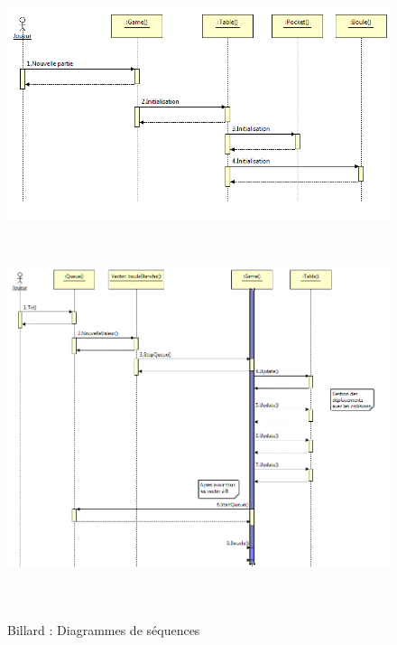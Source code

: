 \begin{figure}[h]
 \centering
 \includegraphics[height=6.5cm]{../umls/UML_images/Billard/sequence1} \hfill
 \includegraphics[height=11cm]{../umls/UML_images/Billard/sequence2} \hfill
 \caption{Billard : Diagrammes de séquences}
\end{figure}

\clearpage

